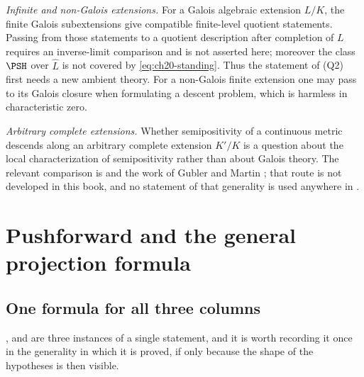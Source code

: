 \emph{Infinite and non-Galois extensions.}  For a Galois algebraic
extension $L/K$, the finite Galois subextensions give compatible
finite-level quotient statements.  Passing from those statements to a
quotient description after completion of $L$ requires an inverse-limit
comparison and is not asserted here; moreover the class $\PSH$ over
$\widehat L$ is not covered by \eqref{eq:ch20-standing}.  Thus the
statement of (Q2) first needs a new ambient theory.  For a non-Galois
finite extension one may pass to its Galois closure when formulating a
descent problem, which is harmless in characteristic zero.

\emph{Arbitrary complete extensions.}  Whether semipositivity of a
continuous metric descends along an arbitrary complete extension
$K'/K$ is a question about the local characterization of semipositivity
rather than about Galois theory.  The relevant comparison is
 and the work of Gubler and Martin
\cite{GM19}; that route is not developed in this book, and no statement of
that generality is used anywhere in .

\section{Pushforward and the general projection formula}
\label{sec:ch30-pushforward}

\subsection{One formula for all three columns}
\label{sec:ch30-general-projection}

,
 and
 are three instances of a single statement, and it
is worth recording it once in the generality in which it is proved, if only
because the shape of the hypotheses is then visible.

